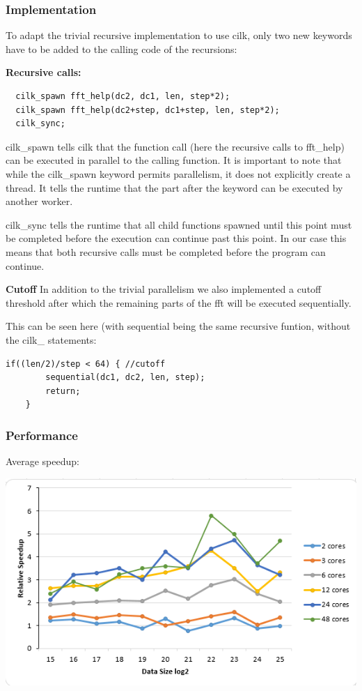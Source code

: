 \subsubsection{Implementation}
To adapt the trivial recursive implementation to use cilk, only two new keywords have to be added to the calling code of the recursions:

\textbf{Recursive calls:}
\begin{lstlisting}
  cilk_spawn fft_help(dc2, dc1, len, step*2);
  cilk_spawn fft_help(dc2+step, dc1+step, len, step*2);
  cilk_sync;
\end{lstlisting}

cilk\_spawn tells cilk that the function call (here the recursive calls to fft\_help) can be executed in parallel to the calling function. It is important to note that while the cilk\_spawn keyword permits parallelism, it does not explicitly create a thread. It tells the runtime that the part after the keyword can be executed by another worker. 

cilk\_sync  tells the runtime that all child functions spawned until this point must be completed before the execution can continue past this point. In our case this means that both recursive calls must be completed before the program can continue. 

\textbf{Cutoff}
In addition to the trivial parallelism we also implemented a cutoff threshold after which the remaining parts of the fft will be executed sequentially. 

This can be seen here (with sequential being the same recursive funtion, without the cilk\_ statements: 
\begin{lstlisting}
if((len/2)/step < 64) { //cutoff
		sequential(dc1, dc2, len, step);
		return;
	}
\end{lstlisting}

\subsubsection{Performance}

Average speedup:

\includegraphics[width=\textwidth]{cilk_rec_avg.png}

